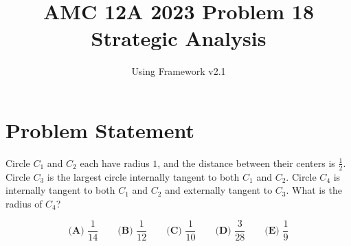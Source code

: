 \documentclass[11pt]{article}
\begin{document}
\title{\textbf{AMC 12A 2023 Problem 18}\\Strategic Analysis}
\author{Using Framework v2.1}
\date{}
\maketitle

\section*{Problem Statement}

Circle $C_1$ and $C_2$ each have radius $1$, and the distance between their centers is $\frac{1}{2}$. Circle $C_3$ is the largest circle internally tangent to both $C_1$ and $C_2$. Circle $C_4$ is internally tangent to both $C_1$ and $C_2$ and externally tangent to $C_3$. What is the radius of $C_4$?

\[\textbf{(A) } \frac{1}{14} \qquad \textbf{(B) } \frac{1}{12} \qquad \textbf{(C) } \frac{1}{10} \qquad \textbf{(D) } \frac{3}{28} \qquad \textbf{(E) } \frac{1}{9}\]
\end{document}
